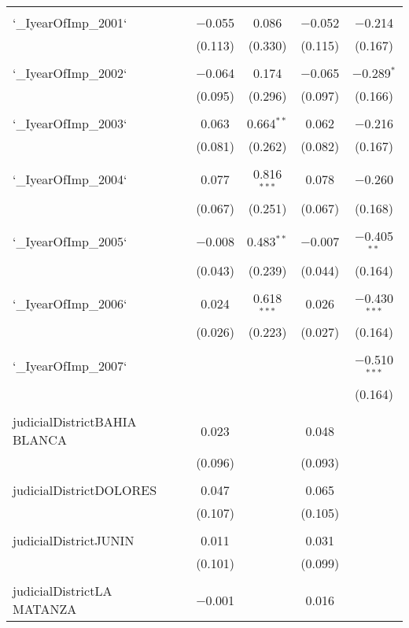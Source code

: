 \begin{table}[!htbp]
\begin{tabular}{@{\extracolsep{5pt}}lccccc}
  & & & & & \\ 
 `\_IyearOfImp\_2001` &  & $-$0.055 & 0.086 & $-$0.052 & $-$0.214 \\ 
  &  & (0.113) & (0.330) & (0.115) & (0.167) \\ 
  & & & & & \\ 
 `\_IyearOfImp\_2002` &  & $-$0.064 & 0.174 & $-$0.065 & $-$0.289$^{*}$ \\ 
  &  & (0.095) & (0.296) & (0.097) & (0.166) \\ 
  & & & & & \\ 
 `\_IyearOfImp\_2003` &  & 0.063 & 0.664$^{**}$ & 0.062 & $-$0.216 \\ 
  &  & (0.081) & (0.262) & (0.082) & (0.167) \\ 
  & & & & & \\ 
 `\_IyearOfImp\_2004` &  & 0.077 & 0.816$^{***}$ & 0.078 & $-$0.260 \\ 
  &  & (0.067) & (0.251) & (0.067) & (0.168) \\ 
  & & & & & \\ 
 `\_IyearOfImp\_2005` &  & $-$0.008 & 0.483$^{**}$ & $-$0.007 & $-$0.405$^{**}$ \\ 
  &  & (0.043) & (0.239) & (0.044) & (0.164) \\ 
  & & & & & \\ 
 `\_IyearOfImp\_2006` &  & 0.024 & 0.618$^{***}$ & 0.026 & $-$0.430$^{***}$ \\ 
  &  & (0.026) & (0.223) & (0.027) & (0.164) \\ 
  & & & & & \\ 
 `\_IyearOfImp\_2007` &  &  &  &  & $-$0.510$^{***}$ \\ 
  &  &  &  &  & (0.164) \\ 
  & & & & & \\ 
 judicialDistrictBAHIA BLANCA &  & 0.023 &  & 0.048 &  \\ 
  &  & (0.096) &  & (0.093) &  \\ 
  & & & & & \\ 
 judicialDistrictDOLORES &  & 0.047 &  & 0.065 &  \\ 
  &  & (0.107) &  & (0.105) &  \\ 
  & & & & & \\ 
 judicialDistrictJUNIN &  & 0.011 &  & 0.031 &  \\ 
  &  & (0.101) &  & (0.099) &  \\ 
  & & & & & \\ 
 judicialDistrictLA MATANZA &  & $-$0.001 &  & 0.016 &  \\ 

\end{tabular}
\end{table}
